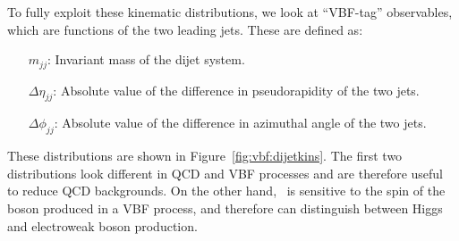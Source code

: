 To fully exploit these kinematic distributions, we look at ``VBF-tag'' observables, which are functions of the two leading jets. 
These are defined as:
\begin{itemize}
    \item[$m_{jj}$:] Invariant mass of the dijet system.
    \item[$\Delta\eta_{jj}$:] Absolute value of the difference in pseudorapidity of the two jets.
    \item[$\Delta\phi_{jj}$:] Absolute value of the difference in azimuthal angle of the two jets.
\end{itemize}
These distributions are shown in Figure~\ref{fig:vbf:dijetkins}.
The first two distributions look different in QCD and VBF processes and are therefore useful to reduce QCD backgrounds.
On the other hand, \dphi~is sensitive to the spin of the boson produced in a VBF process, and therefore can distinguish between Higgs and electroweak boson production.


